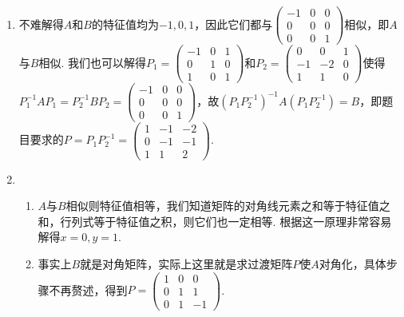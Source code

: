\begin{enumerate}
    \item 不难解得$A$和$B$的特征值均为$-1,0,1$，因此它们都与$\begin{pmatrix}
        -1 & 0 & 0 \\ 0 & 0 & 0 \\ 0 & 0 & 1
    \end{pmatrix}$相似，即$A$与$B$相似. 我们也可以解得$P_1=\begin{pmatrix}
        -1 & 0 & 1 \\ 0 & 1 & 0 \\ 1 & 0 & 1
    \end{pmatrix}$和$P_2=\begin{pmatrix}
        0 & 0 & 1 \\ -1 & -2 & 0 \\ 1 & 1 & 0
    \end{pmatrix}$使得$P_1^{-1}AP_1=P_2^{-1}BP_2=\begin{pmatrix}
        -1 & 0 & 0 \\ 0 & 0 & 0 \\ 0 & 0 & 1
    \end{pmatrix}$，故$(P_1P_2^{-1})^{-1}A(P_1P_2^{-1})=B$，即题目要求的$P=P_1P_2^{-1}=\begin{pmatrix}
        1 & -1 & -2 \\ 0 & -1 & -1 \\ 1 & 1 & 2
    \end{pmatrix}$.

    \item \begin{enumerate}
        \item $A$与$B$相似则特征值相等，我们知道矩阵的对角线元素之和等于特征值之和，行列式等于特征值之积，则它们也一定相等. 根据这一原理非常容易解得$x=0,y=1$.
        \item 事实上$B$就是对角矩阵，实际上这里就是求过渡矩阵$P$使$A$对角化，具体步骤不再赘述，得到$P=\begin{pmatrix}
            1 & 0 & 0 \\ 0 & 1 & 1 \\ 0 & 1 & -1
        \end{pmatrix}$.
    \end{enumerate}


\end{enumerate}
